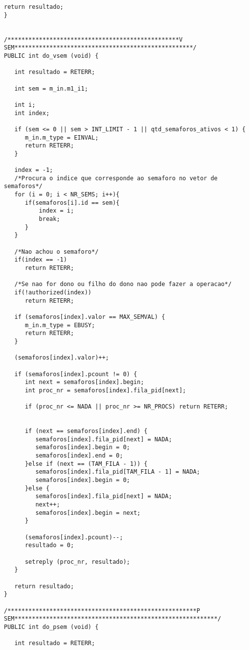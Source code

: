 \documentclass[brazil, a4paper]{scrartcl}
\begin{document}
\begin{lstlisting}[style=customc]
   return resultado;
}


/*************************************************V SEM***************************************************/
PUBLIC int do_vsem (void) {
    
   int resultado = RETERR;  
    
   int sem = m_in.m1_i1;

   int i;
   int index;
    
   if (sem <= 0 || sem > INT_LIMIT - 1 || qtd_semaforos_ativos < 1) {
      m_in.m_type = EINVAL;
      return RETERR;
   }
    
   index = -1;
   /*Procura o indice que corresponde ao semaforo no vetor de semaforos*/
   for (i = 0; i < NR_SEMS; i++){
      if(semaforos[i].id == sem){
          index = i;
          break;
      }
   }

   /*Nao achou o semaforo*/
   if(index == -1)
      return RETERR;    

   /*Se nao for dono ou filho do dono nao pode fazer a operacao*/
   if(!authorized(index))
      return RETERR;

   if (semaforos[index].valor == MAX_SEMVAL) {
      m_in.m_type = EBUSY;
      return RETERR;
   }
    
   (semaforos[index].valor)++;
    
   if (semaforos[index].pcount != 0) {
      int next = semaforos[index].begin;
      int proc_nr = semaforos[index].fila_pid[next];
       
      if (proc_nr <= NADA || proc_nr >= NR_PROCS) return RETERR;
      
       
      if (next == semaforos[index].end) {
         semaforos[index].fila_pid[next] = NADA;  
         semaforos[index].begin = 0;  
         semaforos[index].end = 0;  
      }else if (next == (TAM_FILA - 1)) {
         semaforos[index].fila_pid[TAM_FILA - 1] = NADA;
         semaforos[index].begin = 0;  
      }else {
         semaforos[index].fila_pid[next] = NADA;
         next++;  
         semaforos[index].begin = next;
      }
       
      (semaforos[index].pcount)--;  
      resultado = 0;
       
      setreply (proc_nr, resultado);
   }
   
   return resultado;
}

/******************************************************P SEM**********************************************************/
PUBLIC int do_psem (void) {
    
   int resultado = RETERR;  
    

\end{lstlisting}
\end{document}

